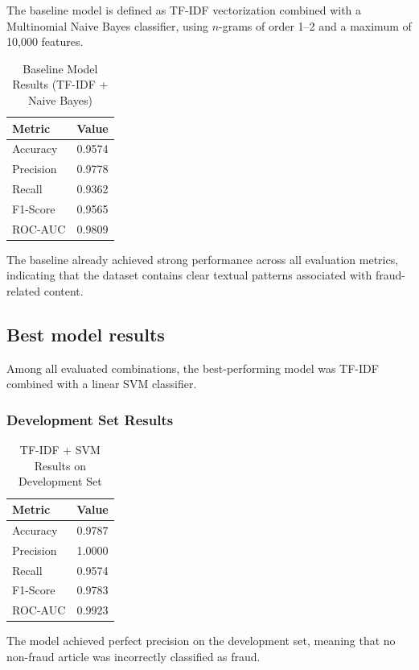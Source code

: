 \documentclass[conference]{IEEEtran}
\begin{document}
The baseline model is defined as TF-IDF vectorization combined with a Multinomial Naive Bayes classifier, using $n$-grams of order 1--2 and a maximum of 10,000 features.

\begin{table}[h]
\caption{Baseline Model Results (TF-IDF + Naive Bayes)}
\label{tab:baseline}
\centering
\begin{tabular}{lc}
\toprule
Metric & Value \\
\midrule
Accuracy & 0.9574 \\
Precision & 0.9778 \\
Recall & 0.9362 \\
F1-Score & 0.9565 \\
ROC-AUC & 0.9809 \\
\bottomrule
\end{tabular}
\end{table}

The baseline already achieved strong performance across all evaluation metrics, indicating that the dataset contains clear textual patterns associated with fraud-related content.

\subsection{Best model results}

Among all evaluated combinations, the best-performing model was TF-IDF combined with a linear SVM classifier.

\subsubsection{Development Set Results}

\begin{table}[h]
\caption{TF-IDF + SVM Results on Development Set}
\label{tab:devresults}
\centering
\begin{tabular}{lc}
\toprule
Metric & Value \\
\midrule
Accuracy & 0.9787 \\
Precision & 1.0000 \\
Recall & 0.9574 \\
F1-Score & 0.9783 \\
ROC-AUC & 0.9923 \\
\bottomrule
\end{tabular}
\end{table}

The model achieved perfect precision on the development set, meaning that no non-fraud article was incorrectly classified as fraud.
\end{document}
